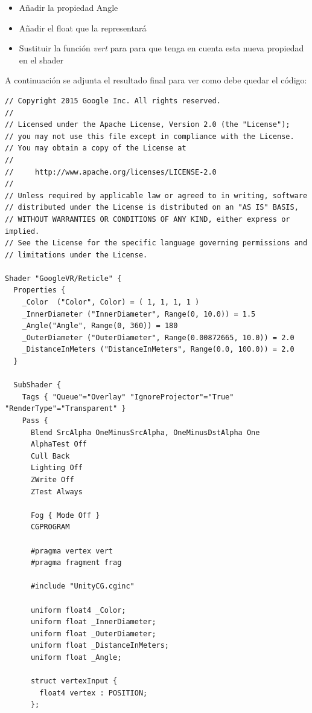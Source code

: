 \begin{itemize}
	\item Añadir la propiedad Angle
	\item Añadir el float que la representará
	\item Sustituir la función \textit{vert} para para que tenga en cuenta esta nueva propiedad en el shader 
\end{itemize}

\quad A continuación se adjunta el resultado final para ver como debe quedar el código:

\lstset{language=[sharp]C, breaklines=true, basicstyle=\footnotesize}
\begin{lstlisting}[frame=single, caption={GvrReticleShader.shader}]
// Copyright 2015 Google Inc. All rights reserved.
//
// Licensed under the Apache License, Version 2.0 (the "License");
// you may not use this file except in compliance with the License.
// You may obtain a copy of the License at
//
//     http://www.apache.org/licenses/LICENSE-2.0
//
// Unless required by applicable law or agreed to in writing, software
// distributed under the License is distributed on an "AS IS" BASIS,
// WITHOUT WARRANTIES OR CONDITIONS OF ANY KIND, either express or implied.
// See the License for the specific language governing permissions and
// limitations under the License.

Shader "GoogleVR/Reticle" {
  Properties {
    _Color  ("Color", Color) = ( 1, 1, 1, 1 )
    _InnerDiameter ("InnerDiameter", Range(0, 10.0)) = 1.5
    _Angle("Angle", Range(0, 360)) = 180
    _OuterDiameter ("OuterDiameter", Range(0.00872665, 10.0)) = 2.0
    _DistanceInMeters ("DistanceInMeters", Range(0.0, 100.0)) = 2.0
  }

  SubShader {
    Tags { "Queue"="Overlay" "IgnoreProjector"="True" "RenderType"="Transparent" }
    Pass {
      Blend SrcAlpha OneMinusSrcAlpha, OneMinusDstAlpha One
      AlphaTest Off
      Cull Back
      Lighting Off
      ZWrite Off
      ZTest Always

      Fog { Mode Off }
      CGPROGRAM

      #pragma vertex vert
      #pragma fragment frag

      #include "UnityCG.cginc"

      uniform float4 _Color;
      uniform float _InnerDiameter;
      uniform float _OuterDiameter;
      uniform float _DistanceInMeters;
      uniform float _Angle;

      struct vertexInput {
        float4 vertex : POSITION;
      };


\end{lstlisting}
